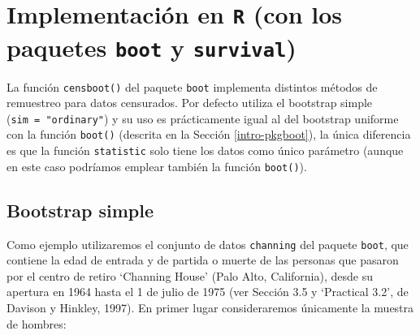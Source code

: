 \documentclass[
]{book}
\newenvironment{Shaded}{\begin{snugshade}}{\end{snugshade}}
\newcommand{\AttributeTok}[1]{\textcolor[rgb]{0.13,0.29,0.53}{#1}}
\newcommand{\CommentTok}[1]{\textcolor[rgb]{0.56,0.35,0.01}{\textit{#1}}}
\newcommand{\DecValTok}[1]{\textcolor[rgb]{0.00,0.00,0.81}{#1}}
\newcommand{\FunctionTok}[1]{\textcolor[rgb]{0.13,0.29,0.53}{\textbf{#1}}}
\newcommand{\NormalTok}[1]{#1}
\newcommand{\OtherTok}[1]{\textcolor[rgb]{0.56,0.35,0.01}{#1}}
\newcommand{\SpecialCharTok}[1]{\textcolor[rgb]{0.81,0.36,0.00}{\textbf{#1}}}
\newcommand{\StringTok}[1]{\textcolor[rgb]{0.31,0.60,0.02}{#1}}
\theoremstyle{break}
\theoremstyle{nonumberplain}
\renewcommand{\CommentTok}[1]{\textcolor[rgb]{0.41,0.41,0.41}{\texttt{#1}}}
\begin{document}
\section{\texorpdfstring{Implementación en \texttt{R} (con los paquetes \texttt{boot} y \texttt{survival})}{Implementación en R (con los paquetes boot y survival)}}\label{implementaciuxf3n-en-r-con-los-paquetes-boot-y-survival}

La función \texttt{censboot()} del paquete \texttt{boot} implementa distintos métodos
de remuestreo para datos censurados. Por defecto utiliza el bootstrap simple
(\texttt{sim\ =\ "ordinary"}) y su uso es prácticamente igual al del bootstrap uniforme
con la función \texttt{boot()} (descrita en la Sección \ref{intro-pkgboot}),
la única diferencia es que la función \texttt{statistic} solo tiene los datos
como único parámetro (aunque en este caso podríamos emplear también
la función \texttt{boot()}).

\subsection{Bootstrap simple}\label{bootstrap-simple}

Como ejemplo utilizaremos el conjunto de datos \texttt{channing} del paquete \texttt{boot},
que contiene la edad de entrada y de partida o muerte de las personas
que pasaron por el centro de retiro `Channing House' (Palo Alto, California),
desde su apertura en 1964 hasta el 1 de julio de 1975
(ver Sección 3.5 y `Practical 3.2', de Davison y Hinkley, 1997).
En primer lugar consideraremos únicamente la muestra de hombres:

\begin{Shaded}
\end{Shaded}
\end{document}
